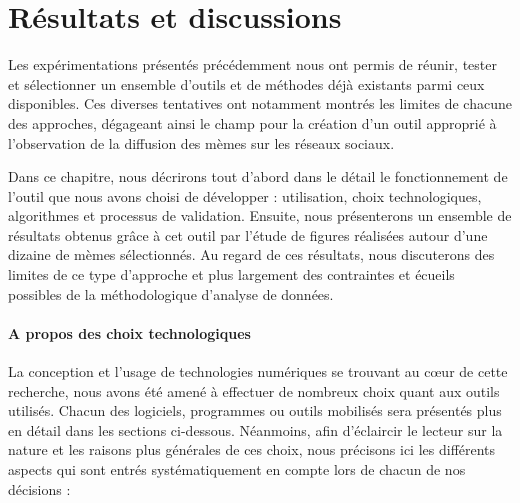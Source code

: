 \chapter{Résultats et discussions}

Les expérimentations présentés précédemment nous ont permis de réunir, tester et sélectionner un ensemble d'outils et de méthodes déjà existants parmi ceux disponibles. Ces diverses tentatives ont notamment montrés les limites de chacune des approches, dégageant ainsi le champ pour la création d'un outil approprié à l'observation de la diffusion des mèmes sur les réseaux sociaux. 

Dans ce chapitre, nous décrirons tout d'abord dans le détail le fonctionnement de l'outil que nous avons choisi de développer : utilisation, choix technologiques, algorithmes et processus de validation. Ensuite, nous présenterons un ensemble de résultats obtenus grâce à cet outil par l'étude de figures réalisées autour d'une dizaine de mèmes sélectionnés. Au regard de ces résultats, nous discuterons des limites de ce type d'approche et plus largement des contraintes et écueils possibles de la méthodologique d'analyse de données.

\subsubsection{A propos des choix technologiques}

La conception et l'usage de technologies numériques se trouvant au cœur de cette recherche, nous avons été amené à effectuer de nombreux choix quant aux outils utilisés. Chacun des logiciels, programmes ou outils mobilisés sera présentés plus en détail dans les sections ci-dessous. Néanmoins, afin d'éclaircir le lecteur sur la nature et les raisons plus générales de ces choix, nous précisons ici les différents aspects qui sont entrés systématiquement en compte lors de chacun de  nos décisions :


